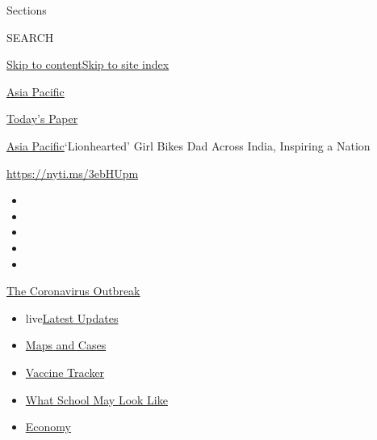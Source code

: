 Sections

SEARCH

\protect\hyperlink{site-content}{Skip to
content}\protect\hyperlink{site-index}{Skip to site index}

\href{https://www.nytimes.com/section/world/asia}{Asia Pacific}

\href{https://myaccount.nytimes.com/auth/login?response_type=cookie\&client_id=vi}{}

\href{https://www.nytimes.com/section/todayspaper}{Today's Paper}

\href{/section/world/asia}{Asia Pacific}\textbar{}`Lionhearted' Girl
Bikes Dad Across India, Inspiring a Nation

\url{https://nyti.ms/3ebHUpm}

\begin{itemize}
\item
\item
\item
\item
\item
\end{itemize}

\href{https://www.nytimes.com/news-event/coronavirus?action=click\&pgtype=Article\&state=default\&region=TOP_BANNER\&context=storylines_menu}{The
Coronavirus Outbreak}

\begin{itemize}
\tightlist
\item
  live\href{https://www.nytimes.com/2020/08/02/world/coronavirus-updates.html?action=click\&pgtype=Article\&state=default\&region=TOP_BANNER\&context=storylines_menu}{Latest
  Updates}
\item
  \href{https://www.nytimes.com/interactive/2020/us/coronavirus-us-cases.html?action=click\&pgtype=Article\&state=default\&region=TOP_BANNER\&context=storylines_menu}{Maps
  and Cases}
\item
  \href{https://www.nytimes.com/interactive/2020/science/coronavirus-vaccine-tracker.html?action=click\&pgtype=Article\&state=default\&region=TOP_BANNER\&context=storylines_menu}{Vaccine
  Tracker}
\item
  \href{https://www.nytimes.com/interactive/2020/07/29/us/schools-reopening-coronavirus.html?action=click\&pgtype=Article\&state=default\&region=TOP_BANNER\&context=storylines_menu}{What
  School May Look Like}
\item
  \href{https://www.nytimes.com/live/2020/07/31/business/stock-market-today-coronavirus?action=click\&pgtype=Article\&state=default\&region=TOP_BANNER\&context=storylines_menu}{Economy}
\end{itemize}

